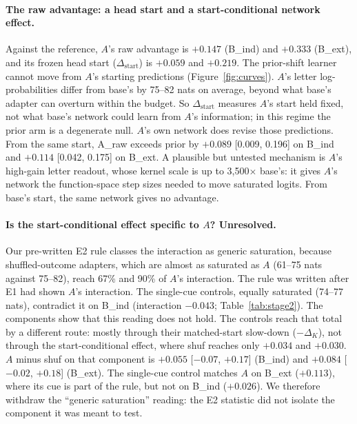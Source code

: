 \documentclass[11pt]{article}
\begin{document}
\paragraph{The raw advantage: a head start and a start-conditional network effect.} Against the reference, $A$'s raw advantage is $+0.147$ (B\_ind) and $+0.333$ (B\_ext), and its frozen head start ($\Delta_{\text{start}}$) is $+0.059$ and $+0.219$. The prior-shift learner cannot move from $A$'s starting predictions (Figure~\ref{fig:curves}). $A$'s letter log-probabilities differ from base's by 75--82 nats on average, beyond what base's adapter can overturn within the budget. So $\Delta_{\text{start}}$ measures $A$'s start held fixed, not what base's network could learn from $A$'s information; in this regime the prior arm is a degenerate null. $A$'s own network does revise those predictions. From the same start, A\_raw exceeds prior by $+0.089$ [0.009, 0.196] on B\_ind and $+0.114$ [0.042, 0.175] on B\_ext. A plausible but untested mechanism is $A$'s high-gain letter readout, whose kernel scale is up to 3{,}500$\times$ base's: it gives $A$'s network the function-space step sizes needed to move saturated logits. From base's start, the same network gives no advantage.

\paragraph{Is the start-conditional effect specific to $A$? Unresolved.} Our pre-written E2 rule classes the interaction as generic saturation, because shuffled-outcome adapters, which are almost as saturated as $A$ (61--75 nats against 75--82), reach 67\% and 90\% of $A$'s interaction. The rule was written after E1 had shown $A$'s interaction. The single-cue controls, equally saturated (74--77 nats), contradict it on B\_ind (interaction $-0.043$; Table~\ref{tab:stage2}). The components show that this reading does not hold. The controls reach that total by a different route: mostly through their matched-start slow-down ($-\Delta_K$), not through the start-conditional effect, where shuf reaches only $+0.034$ and $+0.030$. $A$ minus shuf on that component is $+0.055$ [$-0.07$, $+0.17$] (B\_ind) and $+0.084$ [$-0.02$, $+0.18$] (B\_ext). The single-cue control matches $A$ on B\_ext ($+0.113$), where its cue is part of the rule, but not on B\_ind ($+0.026$). We therefore withdraw the ``generic saturation'' reading: the E2 statistic did not isolate the component it was meant to test.
\end{document}
